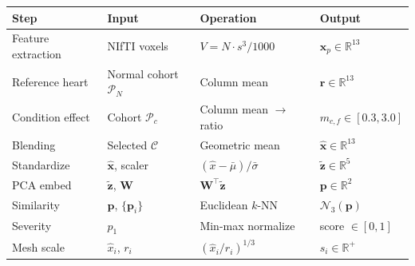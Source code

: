 \documentclass[11pt]{article}
\begin{document}
\begin{center}
\begin{tabular}{llll}
\toprule
\textbf{Step} & \textbf{Input} & \textbf{Operation} & \textbf{Output} \\
\midrule
Feature extraction & NIfTI voxels & $V = N \cdot s^3 / 1000$ & $\mathbf{x}_p \in \mathbb{R}^{13}$ \\
Reference heart    & Normal cohort $\mathcal{P}_N$ & Column mean & $\mathbf{r} \in \mathbb{R}^{13}$ \\
Condition effect   & Cohort $\mathcal{P}_c$ & Column mean $\to$ ratio & $m_{c,f} \in [0.3, 3.0]$ \\
Blending           & Selected $\mathcal{C}$ & Geometric mean & $\hat{\mathbf{x}} \in \mathbb{R}^{13}$ \\
Standardize        & $\hat{\mathbf{x}}$, scaler & $(\hat{x} - \bar\mu)/\bar\sigma$ & $\tilde{\mathbf{z}} \in \mathbb{R}^5$ \\
PCA embed          & $\tilde{\mathbf{z}}$, $\mathbf{W}$ & $\mathbf{W}^\top \tilde{\mathbf{z}}$ & $\mathbf{p} \in \mathbb{R}^2$ \\
Similarity         & $\mathbf{p}$, $\{\mathbf{p}_i\}$ & Euclidean $k$-NN & $\mathcal{N}_3(\mathbf{p})$ \\
Severity           & $p_1$ & Min-max normalize & score $\in [0, 1]$ \\
Mesh scale         & $\hat{x}_i$, $r_i$ & $(\hat{x}_i/r_i)^{1/3}$ & $s_i \in \mathbb{R}^+$ \\
\bottomrule
\end{tabular}
\end{center}
\end{document}
